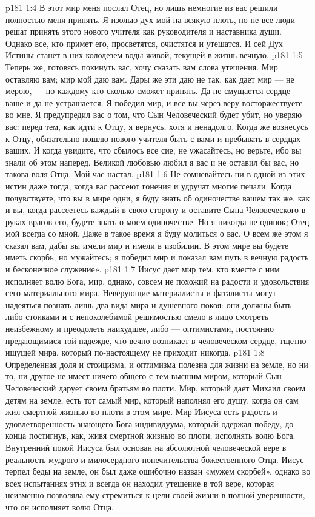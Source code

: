 \vs p181 1:4 В этот мир меня послал Отец, но лишь немногие из вас решили полностью меня принять. Я изолью дух мой на всякую плоть, но не все люди решат принять этого нового учителя как руководителя и наставника души. Однако все, кто примет его, просветятся, очистятся и утешатся. И сей Дух Истины станет в них колодезем воды живой, текущей в жизнь вечную.
\vs p181 1:5 Теперь же, готовясь покинуть вас, хочу сказать вам слова утешения. Мир оставляю вам; мир мой даю вам. Дары же эти даю не так, как дает мир --- не мерою, --- но каждому кто сколько сможет принять. Да не смущается сердце ваше и да не устрашается. Я победил мир, и все вы через веру восторжествуете во мне. Я предупредил вас о том, что Сын Человеческий будет убит, но уверяю вас: перед тем, как идти к Отцу, я вернусь, хотя и ненадолго. Когда же вознесусь к Отцу, обязательно пошлю нового учителя быть с вами и пребывать в сердцах ваших. И когда увидите, что сбылось все сие, не ужасайтесь, но верьте, ибо вы знали об этом наперед. Великой любовью любил я вас и не оставил бы вас, но такова воля Отца. Мой час настал.
\vs p181 1:6 Не сомневайтесь ни в одной из этих истин даже тогда, когда вас рассеют гонения и удручат многие печали. Когда почувствуете, что вы в мире одни, я буду знать об одиночестве вашем так же, как и вы, когда рассеетесь каждый в свою сторону и оставите Сына Человеческого в руках врагов его, будете знать о моем одиночестве. Но я никогда не одинок; Отец мой всегда со мной. Даже в такое время я буду молиться о вас. О всем же этом я сказал вам, дабы вы имели мир и имели в изобилии. В этом мире вы будете иметь скорбь; но мужайтесь; я победил мир и показал вам путь в вечную радость и бесконечное служение».
\vs p181 1:7 \pc Иисус дает мир тем, кто вместе с ним исполняет волю Бога, мир, однако, совсем не похожий на радости и удовольствия сего материального мира. Неверующие материалисты и фаталисты могут надеяться познать лишь два вида мира и душевного покоя: они должны быть либо стоиками и с непоколебимой решимостью смело в лицо смотреть неизбежному и преодолеть наихудшее, либо --- оптимистами, постоянно предающимися той надежде, что вечно возникает в человеческом сердце, тщетно ищущей мира, который по\hyp{}настоящему не приходит никогда.
\vs p181 1:8 Определенная доля и стоицизма, и оптимизма полезна для жизни на земле, но ни то, ни другое не имеет ничего общего с тем высшим миром, который Сын Человеческий дарует своим братьям во плоти. Мир, который дает Михаил своим детям на земле, есть тот самый мир, который наполнял его душу, когда он сам жил смертной жизнью во плоти в этом мире. Мир Иисуса есть радость и удовлетворенность знающего Бога индивидуума, который одержал победу, до конца постигнув, как, живя смертной жизнью во плоти, исполнять волю Бога. Внутренний покой Иисуса был основан на абсолютной человеческой вере в реальность мудрого и милосердного попечительства божественного Отца. Иисус терпел беды на земле, он был даже ошибочно назван «мужем скорбей», однако во всех испытаниях этих и всегда он находил утешение в той вере, которая неизменно позволяла ему стремиться к цели своей жизни в полной уверенности, что он исполняет волю Отца.
